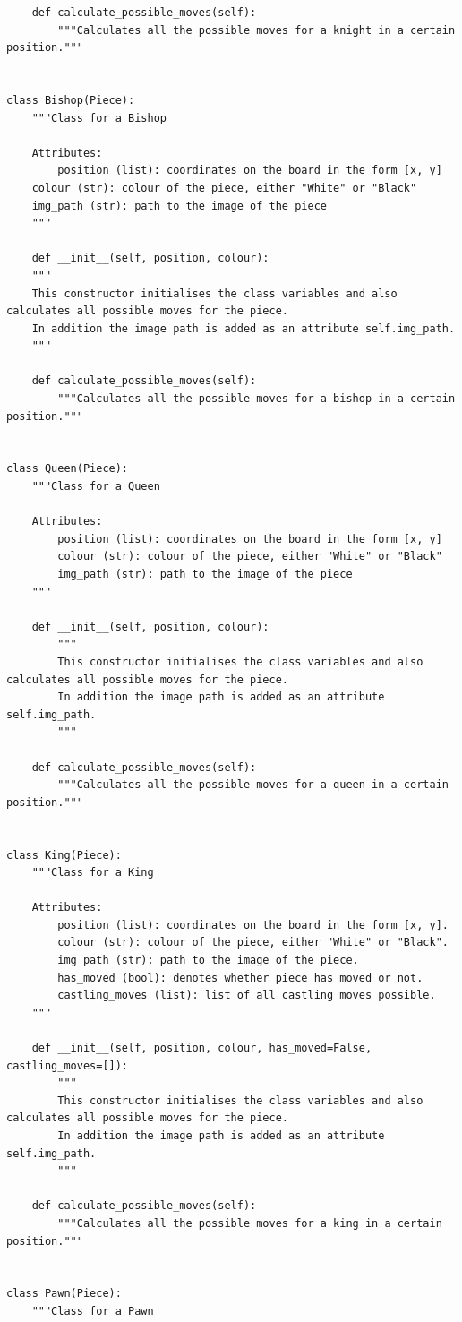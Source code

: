 \begin{verbatim}
 	def calculate_possible_moves(self):
		"""Calculates all the possible moves for a knight in a certain position."""
	

class Bishop(Piece):
	"""Class for a Bishop

	Attributes:
		position (list): coordinates on the board in the form [x, y]
	colour (str): colour of the piece, either "White" or "Black"
	img_path (str): path to the image of the piece
	"""
	
	def __init__(self, position, colour):
	"""
	This constructor initialises the class variables and also calculates all possible moves for the piece.
	In addition the image path is added as an attribute self.img_path.
	"""
	
 	def calculate_possible_moves(self):
		"""Calculates all the possible moves for a bishop in a certain position."""
	

class Queen(Piece):
	"""Class for a Queen

	Attributes:
		position (list): coordinates on the board in the form [x, y]
		colour (str): colour of the piece, either "White" or "Black"
		img_path (str): path to the image of the piece
	"""

	def __init__(self, position, colour):
		"""
		This constructor initialises the class variables and also calculates all possible moves for the piece.
		In addition the image path is added as an attribute self.img_path.
		"""
	
 	def calculate_possible_moves(self):
		"""Calculates all the possible moves for a queen in a certain position."""
		

class King(Piece):
	"""Class for a King

	Attributes:
		position (list): coordinates on the board in the form [x, y].
		colour (str): colour of the piece, either "White" or "Black".
		img_path (str): path to the image of the piece.
		has_moved (bool): denotes whether piece has moved or not.
		castling_moves (list): list of all castling moves possible.
	"""

	def __init__(self, position, colour, has_moved=False, castling_moves=[]):
		"""
		This constructor initialises the class variables and also calculates all possible moves for the piece.
		In addition the image path is added as an attribute self.img_path.
		"""
	
 	def calculate_possible_moves(self):
		"""Calculates all the possible moves for a king in a certain position."""

	
class Pawn(Piece):
	"""Class for a Pawn


\end{verbatim}

